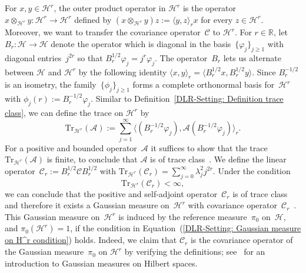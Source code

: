 For $x,y \in \mathcal{H}^r$, the outer product operator in $\mathcal{H}^r$ is the operator~$ x \otimes_{\mathcal{H}^r} y : \mathcal{H}^r \to \mathcal{H}^r $ defined by $ (x \otimes_{\mathcal{H}^r} y) z := \langle y, z \rangle_r x $ for every $ z \in \mathcal{H}^r$. Moreover, we want to transfer the covariance operator~$\mathcal{C}$ to $\mathcal{H}^r$. For $r \in \mathbb{R}$, let $B_r: \mathcal{H} \to \mathcal{H}$ denote the operator which is diagonal in the basis~$\{ \varphi_j \}_{j \geq 1}$ with diagonal entries~$j^{2r}$ so that $B_r^{1/2} \varphi_j = j^{r} \varphi_j$. The operator~$B_r$ lets us alternate between $\mathcal{H}$ and $\mathcal{H}^r$ by the following identity $ \langle x, y \rangle_r = \langle B_r^{1/2} x, B_r^{1/2} y \rangle$. Since $B_r^{-1/2} $ is an isometry, the family~$\{ \phi_j \}_{j \geq 1}$ forms a complete orthonormal basis for~$\mathcal{H}^r$ with $ \phi_j(r) := B_r^{-1/2} \varphi_j$. Similar to Definition~\ref{DLR-Setting: Definition trace class}, we can define the trace on $\mathcal{H}^r$ by
\begin{equation}
 \label{DLR-Setting: Trace on H^s}
 \text{Tr}_{\mathcal{H}^r}(\mathcal{A}) := \sum_{j=1}^{\infty} \langle (B_r^{-1/2}\varphi_j ), \mathcal{A}( B_r^{-1/2}\varphi_j) \rangle_r.
\end{equation}
For a positive and bounded operator~$\mathcal{A}$ it suffices to show that the trace~$\text{Tr}_{\mathcal{H}^r}(\mathcal{A})$ is finite, to conclude that $\mathcal{A}$ is of trace class~\autocite[Proposition C.3]{DaPrato1992}. We define the linear operator~$\mathcal{C}_r := B_r^{1/2} \mathcal{C} B_r^{1/2} $ with $ \text{Tr}_{\mathcal{H}^r}(\mathcal{C}_r) = \sum_{j=0}^{\infty} \lambda_j^2 j^{2r}$. Under the condition
\begin{equation}
\label{DLR-Setting: Gaussian measure on H^r condition}
 \text{Tr}_{\mathcal{H}^r}(\mathcal{C}_r) < \infty,
\end{equation}
we can conclude that the positive and self-adjoint operator~$\mathcal{C}_r$ is of trace class and therefore it exists a Gaussian measure on~$\mathcal{H}^r$ with covariance operator~$\mathcal{C}_r$~\autocite[Proposition 2.18]{DaPrato1992}. This Gaussian measure on~$\mathcal{H}^r$ is induced by the reference measure~$\pi_0$ on~$\mathcal{H}$, and $ \pi_0(\mathcal{H}^r ) =1$, if the condition in Equation~(\ref{DLR-Setting: Gaussian measure on H^r condition}) holds. Indeed, we claim that $\mathcal{C}_r$ is the covariance operator of the Gaussian measure~$\pi_0$ on $\mathcal{H}^r$ by verifying the definitions; see~\autocite[Chapter 2.3]{DaPrato1992} for an introduction to Gaussian measures on Hilbert spaces.

